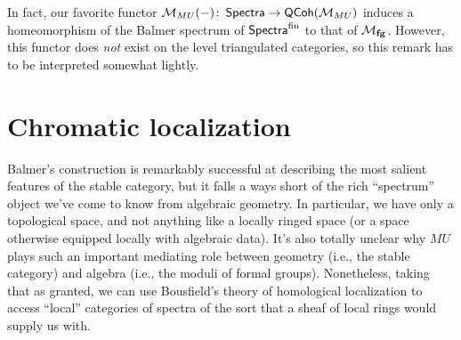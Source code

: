 \begin{remark}
In fact, our favorite functor $\mathcal{M}_{MU}(-)\colon\thinspace \mathsf{Spectra} \to \mathsf{QCoh}(\mathcal{M}_{MU})$ induces a homeomorphism of the Balmer spectrum of $\mathsf{Spectra}^{\mathrm{fin}}$ to that of $\mathcal{M}_{\mathbf{fg}}$.  However, this functor does \emph{not} exist on the level triangulated categories, so this remark has to be interpreted somewhat lightly.
\end{remark}





\section{Chromatic localization}\label{ChromaticLocalizationSection}

Balmer's construction is remarkably successful at describing the most salient features of the stable category, but it falls a ways short of the rich ``spectrum'' object we've come to know from algebraic geometry.  In particular, we have only a topological space, and not anything like a locally ringed space (or a space otherwise equipped locally with algebraic data).  It's also totally unclear why $MU$ plays such an important mediating role between geometry (i.e., the stable category) and algebra (i.e., the moduli of formal groups).
Nonetheless, taking that as granted, we can use Bousfield's theory of homological localization to access ``local'' categories of spectra of the sort that a sheaf of local rings would supply us with.

